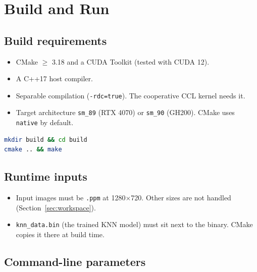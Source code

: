 \appendix
\section{Build and Run}
\label{sec:appendix_build}

\subsection{Build requirements}

\begin{itemize}
  \item CMake $\ge$ 3.18 and a CUDA Toolkit (tested with CUDA 12).
  \item A C++17 host compiler.
  \item Separable compilation (\texttt{-rdc=true}). The cooperative CCL kernel needs it.
  \item Target architecture \texttt{sm\_89} (RTX 4070) or \texttt{sm\_90} (GH200). CMake uses \texttt{native} by default.
\end{itemize}

\begin{lstlisting}[language=bash, caption={Build.}]
mkdir build && cd build
cmake .. && make
\end{lstlisting}

\subsection{Runtime inputs}

\begin{itemize}
  \item Input images must be \texttt{.ppm} at 1280$\times$720. Other sizes are not handled (Section~\ref{sec:workspace}).
  \item \texttt{knn\_data.bin} (the trained KNN model) must sit next to the binary. CMake copies it there at build time.
\end{itemize}

\subsection{Command-line parameters}

